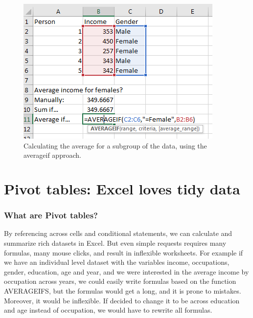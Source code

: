 \documentclass[]{book}
\begin{document}
\begin{figure}

{\centering \includegraphics[width=0.8\linewidth]{_resources/chapter_advexc/11} 

}

\caption{Calculating the average for a subgroup of the data, using the averageif approach.}\label{fig:advex4}
\end{figure}

\hypertarget{pivot-tables-excel-loves-tidy-data}{%
\section{Pivot tables: Excel loves tidy data}\label{pivot-tables-excel-loves-tidy-data}}

\hypertarget{what-are-pivot-tables}{%
\subsubsection*{What are Pivot tables?}\label{what-are-pivot-tables}}

By referencing across cells and conditional statements, we can calculate and summarize rich datasets in Excel. But even simple requests requires many formulas, many mouse clicks, and result in inflexible worksheets. For example if we have an individual level dataset with the variables income, occupations, gender, education, age and year, and we were interested in the average income by occupation across years, we could easily write formulas based on the function
AVERAGEIFS, but the formulas would get a long, and it is prone to mistakes. Moreover, it would be inflexible. If decided to change it to be across education and age instead of occupation, we would have to rewrite all formulas.
\end{document}
